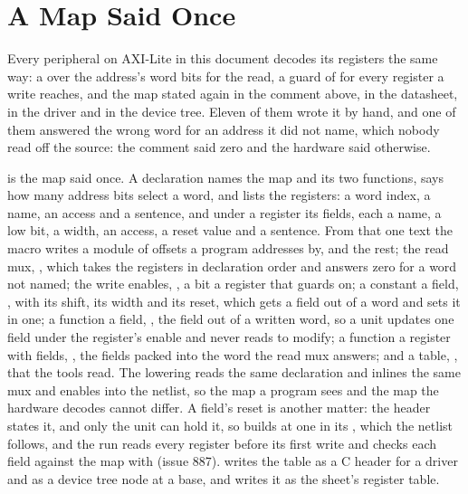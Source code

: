 \section{A Map Said Once}
\label{sec:x-regmap}

Every peripheral on AXI-Lite in this document decodes its registers
the same way: a  over the address's word bits for the
read, a guard of  for every register a write reaches,
and the map stated again in the comment above, in the datasheet, in
the driver and in the device tree. Eleven of them wrote it by hand,
and one of them answered the wrong word for an address it did not
name, which nobody read off the source: the comment said zero and the
hardware said otherwise.

 is the map said once. A declaration names the map and
its two functions, says how many address bits select a word, and
lists the registers: a word index, a name, an access and a sentence,
and under a register its fields, each a name, a low bit, a width, an
access, a reset value and a sentence.
From that one text the macro writes a module of offsets a program
addresses by,  and the rest; the read mux,
, which takes the registers in declaration order
and answers zero for a word not named; the write enables,
, a bit a register that  guards on; a
constant a field, , with its shift, its width
and its reset, which gets a field out of a word and sets it in one; a
function a field, , the field out of a written
word, so a unit updates one field under the register's enable and
never reads to modify; a function a register with fields,
, the fields packed into the word the read mux
answers; and a table, , that the tools read. The lowering reads the
same declaration and inlines the same mux and enables into the
netlist, so the map a program sees and the map the hardware decodes
cannot differ. A field's reset is another matter: the header states
it, and only the unit can hold it, so  builds 
at one in its , which the netlist follows, and the run
reads every register before its first write and checks each field
against the map with  (issue 887).  writes the table as a C header
for a driver and as a device tree node at a base, and
 writes it as the sheet's register table.

